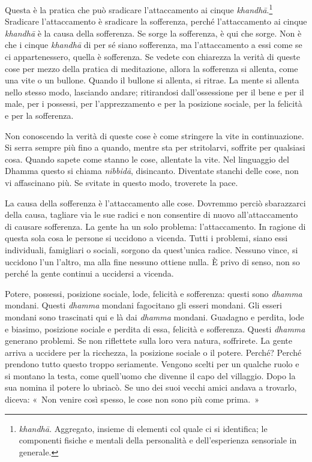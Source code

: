Questa è la pratica che può sradicare l'attaccamento ai cinque
\emph{khandhā}.\footnote{\emph{khandhā.} Aggregato, insieme di elementi
  col quale ci si identifica; le componenti fisiche e mentali della
  personalità e dell'esperienza sensoriale in generale.} Sradicare
l'attaccamento è sradicare la sofferenza, perché l'attaccamento ai
cinque \emph{khandhā} è la causa della sofferenza. Se sorge la
sofferenza, è qui che sorge. Non è che i cinque \emph{khandhā} di per sé
siano sofferenza, ma l'attaccamento a essi come se ci appartenessero,
quella è sofferenza. Se vedete con chiarezza la verità di queste cose
per mezzo della pratica di meditazione, allora la sofferenza si allenta,
come una vite o un bullone. Quando il bullone si allenta, si ritrae. La
mente si allenta nello stesso modo, lasciando andare; ritirandosi
dall'ossessione per il bene e per il male, per i possessi, per
l'apprezzamento e per la posizione sociale, per la felicità e per la
sofferenza.

Non conoscendo la verità di queste cose è come stringere la vite in
continuazione. Si serra sempre più fino a quando, mentre sta per
stritolarvi, soffrite per qualsiasi cosa. Quando sapete come stanno le
cose, allentate la vite. Nel linguaggio del Dhamma questo si chiama
\emph{nibbidā}, disincanto. Diventate stanchi delle cose, non vi
affascinano più. Se svitate in questo modo, troverete la pace.

La causa della sofferenza è l'attaccamento alle cose. Dovremmo perciò
sbarazzarci della causa, tagliare via le sue radici e non consentire di
nuovo all'attaccamento di causare sofferenza. La gente ha un solo
problema: l'attaccamento. In ragione di questa sola cosa le persone si
uccidono a vicenda. Tutti i problemi, siano essi individuali, famigliari
o sociali, sorgono da quest'unica radice. Nessuno vince, si uccidono
l'un l'altro, ma alla fine nessuno ottiene nulla. È privo di senso, non
so perché la gente continui a uccidersi a vicenda.

Potere, possessi, posizione sociale, lode, felicità e sofferenza: questi
sono \emph{dhamma} mondani. Questi \emph{dhamma} mondani fagocitano gli
esseri mondani. Gli esseri mondani sono trascinati qui e là dai
\emph{dhamma} mondani. Guadagno e perdita, lode e biasimo, posizione
sociale e perdita di essa, felicità e sofferenza. Questi \emph{dhamma}
generano problemi. Se non riflettete sulla loro vera natura, soffrirete.
La gente arriva a uccidere per la ricchezza, la posizione sociale o il
potere. Perché? Perché prendono tutto questo troppo seriamente. Vengono
scelti per un qualche ruolo e si montano la testa, come quell'uomo che
divenne il capo del villaggio. Dopo la sua nomina il potere lo ubriacò.
Se uno dei suoi vecchi amici andava a trovarlo, diceva: «~Non venire
così spesso, le cose non sono più come prima.~»

